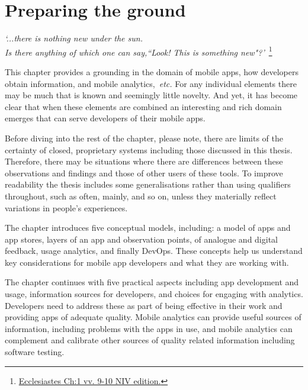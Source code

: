 \setcounter{mtc}{5}

\chapter{Preparing the ground}
\label{chapter-preparing-the-ground}
\emph{`...there is nothing new under the sun. \\Is there anything of which one can say,``Look! This is something new"?'}~\footnote{\href{https://www.biblegateway.com/passage/?search=Ecclesiastes+1\%3A9-10&version=NIV}{Ecclesiastes Ch:1 vv. 9-10 NIV edition.}}

\vspace{10mm}

This chapter provides a grounding in the domain of mobile apps, how developers obtain information, and mobile analytics,~\emph{etc.}  
For any individual elements there may be much that is known and seemingly little novelty. And yet, it has become clear that when these elements are combined an interesting and rich domain emerges that can serve developers of their mobile apps.

Before diving into the rest of the chapter, please note, 
there are limits of the certainty of closed, proprietary systems including those discussed in this thesis. Therefore, there may be situations where there are differences between these observations and findings and those of other users of these tools. To improve readability the thesis includes some generalisations rather than using qualifiers throughout, such as often, mainly, and so on, unless they materially reflect variations in people's experiences.

The chapter introduces five 
conceptual models, including: a model of apps and app stores, layers of an app and observation points, of analogue and digital feedback, usage analytics, and finally DevOps. These concepts help us understand key considerations for mobile app developers and what they are working with.

The chapter continues with five practical aspects including app development and usage, information sources for developers, and choices for engaging with analytics. Developers need to address these as part of being effective in their work and providing apps of adequate quality. Mobile analytics can provide useful sources of information, including problems with the apps in use, and mobile analytics can complement and calibrate other sources of quality related information including software testing. 

